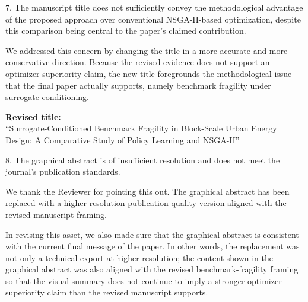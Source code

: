 \begin{ReviewerComment}
7. The manuscript title does not sufficiently convey the methodological advantage of the proposed approach over conventional NSGA-II-based optimization, despite this comparison being central to the paper's claimed contribution.
\end{ReviewerComment}
%
\begin{Answer}
We addressed this concern by changing the title in a more accurate and more conservative direction. Because the revised evidence does not support an optimizer-superiority claim, the new title foregrounds the methodological issue that the final paper actually supports, namely benchmark fragility under surrogate conditioning.
\end{Answer}
\begin{RevisionExcerpt}
\noindent\textbf{Revised title:}\\
``Surrogate-Conditioned Benchmark Fragility in Block-Scale Urban Energy Design: A Comparative Study of Policy Learning and NSGA-II''
\end{RevisionExcerpt}

\begin{ReviewerComment}
8. The graphical abstract is of insufficient resolution and does not meet the journal's publication standards.
\end{ReviewerComment}
%
\begin{Answer}
We thank the Reviewer for pointing this out. The graphical abstract has been replaced with a higher-resolution publication-quality version aligned with the revised manuscript framing.

In revising this asset, we also made sure that the graphical abstract is consistent with the current final message of the paper. In other words, the replacement was not only a technical export at higher resolution; the content shown in the graphical abstract was also aligned with the revised benchmark-fragility framing so that the visual summary does not continue to imply a stronger optimizer-superiority claim than the revised manuscript supports.
\end{Answer}

